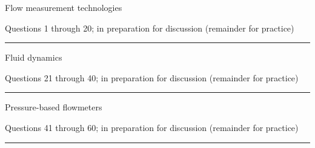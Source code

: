 \vskip 5pt


\vskip 2pt  Flow measurement technologies

\vskip 2pt \noindent Questions 1 through 20;  in preparation for discussion (remainder for practice)

\vskip 10pt



\filbreak
\hrule \vskip 5pt
\noindent {}

\vskip 5pt


\vskip 2pt  Fluid dynamics

\vskip 2pt \noindent Questions 21 through 40;  in preparation for discussion (remainder for practice)

\vskip 10pt



\filbreak
\hrule \vskip 5pt
\noindent {}

\vskip 5pt


\vskip 2pt  Pressure-based flowmeters

\vskip 2pt \noindent Questions 41 through 60;  in preparation for discussion (remainder for practice)

\vskip 10pt




\filbreak
\hrule \vskip 5pt
\noindent {}

